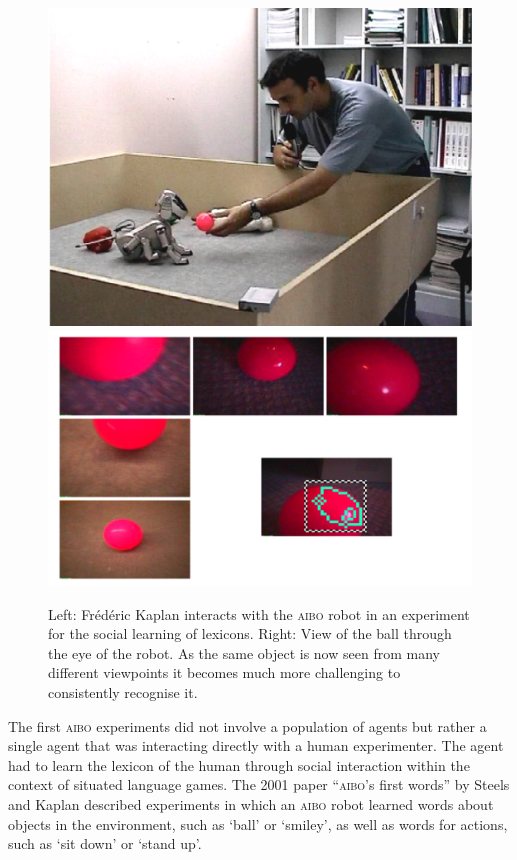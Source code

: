 \begin{figure}[htbp]
  \centerline{\includegraphics[width=.50\textwidth]{chap10/figs/look-ball.pdf}
\includegraphics[width=.45\textwidth]{chap10/figs/views-ball.pdf}}
\caption{\label{f:look-ball}Left: Fr\'{e}d\'{e}ric Kaplan interacts with the \textsc{aibo} robot in an experiment for the social learning of lexicons.
Right: View of the ball through the eye of the robot. As the same object is now seen from many different viewpoints it 
becomes much more challenging to consistently recognise it.}
\end{figure}
The first \textsc{aibo} experiments did not involve a population of agents but rather a single agent that was interacting directly with a human
experimenter. The agent had to learn the lexicon of the human through social 
interaction within the context of situated language games. The 2001
paper ``\textsc{aibo}'s first words'' by Steels and Kaplan  described experiments in which an \textsc{aibo} robot 
learned words about objects in the environment, such as `ball' or `smiley', as well as words for actions, such as 
`sit down' or `stand up'. 

